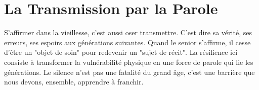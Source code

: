 \section{La Transmission par la Parole}
S'affirmer dans la vieillesse, c'est aussi oser transmettre. C'est dire sa vérité, ses erreurs, ses espoirs aux générations suivantes. Quand le senior s'affirme, il cesse d'être un "objet de soin" pour redevenir un "sujet de récit". La résilience ici consiste à transformer la vulnérabilité physique en une force de parole qui lie les générations. Le silence n'est pas une fatalité du grand âge, c'est une barrière que nous devons, ensemble, apprendre à franchir.
